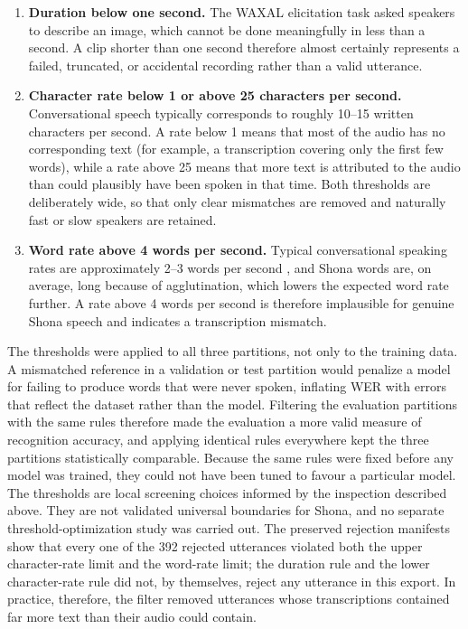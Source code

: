 \begin{enumerate}
    \item \textbf{Duration below one second.} The WAXAL elicitation task asked
    speakers to describe an image, which cannot be done meaningfully in less than
    a second. A clip shorter than one second therefore almost certainly
    represents a failed, truncated, or accidental recording rather than a valid
    utterance.
    \item \textbf{Character rate below 1 or above 25 characters per second.}
    Conversational speech typically corresponds to roughly 10--15 written
    characters per second. A rate below 1 means that most of the audio has no
    corresponding text (for example, a transcription covering only the first few
    words), while a rate above 25 means that more text is attributed to the audio
    than could plausibly have been spoken in that time. Both thresholds are
    deliberately wide, so that only clear mismatches are removed and naturally
    fast or slow speakers are retained.
    \item \textbf{Word rate above 4 words per second.} Typical conversational
    speaking rates are approximately 2--3 words per second \citep{Yuan2006}, and
    Shona words are, on average, long because of agglutination, which lowers the
    expected word rate further. A rate above 4 words per second is therefore
    implausible for genuine Shona speech and indicates a transcription mismatch.
\end{enumerate}

The thresholds were applied to all three partitions, not only to the training
data. A mismatched reference in a validation or test partition would penalize a
model for failing to produce words that were never spoken, inflating WER with
errors that reflect the dataset rather than the model. Filtering the evaluation
partitions with the same rules therefore made the evaluation a more valid
measure of recognition accuracy, and applying identical rules everywhere kept the
three partitions statistically comparable. Because the same rules were fixed
before any model was trained, they could not have been tuned to favour a
particular model. The thresholds are local screening choices informed by the
inspection described above. They are not validated universal boundaries for
Shona, and no separate threshold-optimization study was carried out. The
preserved rejection manifests show that every one of the 392 rejected
utterances violated both the upper character-rate limit and the word-rate
limit; the duration rule and the lower character-rate rule did not, by
themselves, reject any utterance in this export. In practice, therefore, the
filter removed utterances whose transcriptions contained far more text than
their audio could contain.

